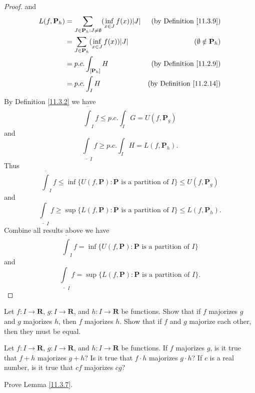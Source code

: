 \begin{proof}
    and
    \begin{align*}
        L(f, \mathbf{P}_h) & = \sum_{J \in \mathbf{P}_h : J \neq \emptyset} (\inf_{x \in J} f(x)) \abs*{J} & \text{(by Definition \ref{11.3.9})} \\
        & = \sum_{J \in \mathbf{P}_h} (\inf_{x \in J} f(x)) \abs*{J} & (\emptyset \notin \mathbf{P}_h) \\
        & = p.c. \int_{[\mathbf{P}_h]} H & \text{(by Definition \ref{11.2.9})} \\
        & = p.c. \int_I H & \text{(by Definition \ref{11.2.14})}
    \end{align*}
    By Definition \ref{11.3.2} we have
    \[
        \overline{\int}_I f \leq p.c. \int_I G = U(f, \mathbf{P}_g)
    \]
    and
    \[
        \underline{\int}_I f \geq p.c. \int_I H = L(f, \mathbf{P}_h).
    \]
    Thus
    \[
        \overline{\int}_I f \leq \inf \{U(f, \mathbf{P}) : \mathbf{P} \text{ is a partition of } I\} \leq U(f, \mathbf{P}_g)
    \]
    and
    \[
        \underline{\int}_I f \geq \sup \{L(f, \mathbf{P}) : \mathbf{P} \text{ is a partition of } I\} \leq L(f, \mathbf{P}_h).
    \]
    Combine all results above we have
    \[
        \overline{\int}_I f = \inf \{U(f, \mathbf{P}) : \mathbf{P} \text{ is a partition of } I\}
    \]
    and
    \[
        \underline{\int}_I f = \sup \{L(f, \mathbf{P}) : \mathbf{P} \text{ is a partition of } I\}.
    \]
\end{proof}

\exercisesection

\begin{exercise}\label{ex 11.3.1}
    Let \(f : I \to \mathbf{R}\), \(g : I \to \mathbf{R}\), and \(h : I \to \mathbf{R}\) be functions.
    Show that if \(f\) majorizes \(g\) and \(g\) majorizes \(h\), then \(f\) majorizes \(h\).
    Show that if \(f\) and \(g\) majorize each other, then they must be equal.
\end{exercise}

\begin{exercise}\label{ex 11.3.2}
    Let \(f : I \to \mathbf{R}\), \(g : I \to \mathbf{R}\), and \(h : I \to \mathbf{R}\) be functions.
    If \(f\) majorizes \(g\), is it true that \(f + h\) majorizes \(g + h\)?
    Is it true that \(f \cdot h\) majorizes \(g \cdot h\)?
    If \(c\) is a real number, is it true that \(cf\) majorizes \(cg\)?
\end{exercise}

\begin{exercise}\label{ex 11.3.3}
    Prove Lemma \ref{11.3.7}.
\end{exercise}

